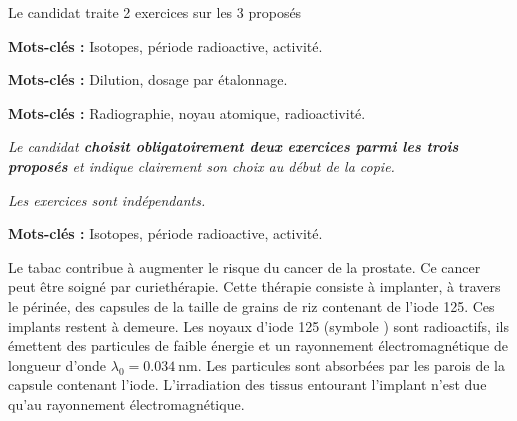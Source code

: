 
\vAligne{-70pt}

\begin{boite}
  \centering
  Le candidat traite  2 exercices sur les 3 proposés

  \begin{multicols}{3}
    \begin{boite}
      \begin{center}
      \end{center}
      \vspace*{-12pt}
      \textbf{Mots-clés :} Isotopes, période radioactive, activité.
    \end{boite}
    \begin{boite}
      \begin{center}
      \end{center}
      \vspace*{-12pt}
      \textbf{Mots-clés :} Dilution, dosage par étalonnage.
    \end{boite}
    \begin{boite}
      \begin{center}
      \end{center}
      \vspace*{-12pt}
      \textbf{Mots-clés :} Radiographie, noyau atomique, radioactivité.
    \end{boite}
  \end{multicols}
\end{boite}

\textit{
  Le candidat \textbf{choisit obligatoirement deux exercices parmi les trois proposés} et indique clairement son choix au début de la copie.
}
  
\textit{
  Les exercices sont indépendants.
}
\vspace*{24pt}


\vspace*{-4pt}
\label{exo:curietherapie}

\textbf{Mots-clés :} Isotopes, période radioactive, activité.
\medskip

Le tabac contribue à augmenter le risque du cancer de la prostate.
Ce cancer peut être soigné par curiethérapie.
Cette thérapie consiste à implanter, à travers le périnée, des capsules de la taille de grains de riz contenant de l'iode 125.
Ces implants restent à demeure. 
Les noyaux d'iode 125 (symbole ) sont radioactifs, ils émettent des particules de faible énergie et un rayonnement électromagnétique de longueur d'onde 
$\lambda_0 = \qty{0,034}{\nm}$.
Les particules sont absorbées par les parois de la capsule contenant l'iode.
L'irradiation des tissus entourant l'implant n'est due qu'au rayonnement électromagnétique.

